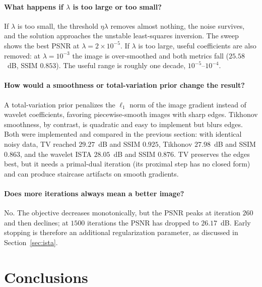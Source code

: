 \documentclass[11pt,a4paper]{article}
\begin{document}
\paragraph{What happens if $\lambda$ is too large or too small?}
If $\lambda$ is too small, the threshold $\eta\lambda$ removes almost nothing, the noise survives,
and the solution approaches the unstable least-squares inversion. The sweep shows the best PSNR at
$\lambda=2\times10^{-5}$. If $\lambda$ is too large, useful coefficients are also removed: at
$\lambda=10^{-3}$ the image is over-smoothed and both metrics fall ($25.58$~dB, SSIM $0.853$).
The useful range is roughly one decade, $10^{-5}$--$10^{-4}$.

\paragraph{How would a smoothness or total-variation prior change the result?}
A total-variation prior penalizes the $\ell_1$ norm of the image gradient instead of wavelet
coefficients, favoring piecewise-smooth images with sharp edges. Tikhonov smoothness, by contrast,
is quadratic and easy to implement but blurs edges. Both were implemented and compared in the
previous section: with identical noisy data, TV reached $29.27$~dB and SSIM $0.925$,
Tikhonov $27.98$~dB and SSIM $0.863$, and the wavelet ISTA $28.05$~dB and SSIM $0.876$. TV
preserves the edges best, but it needs a primal-dual iteration (its proximal step has no closed
form) and can produce staircase artifacts on smooth gradients.

\paragraph{Does more iterations always mean a better image?}
No. The objective decreases monotonically, but the PSNR peaks at iteration $260$ and then declines;
at $1500$ iterations the PSNR has dropped to $26.17$~dB. Early stopping is therefore an additional
regularization parameter, as discussed in Section~\ref{sec:ista}.

\section{Conclusions}
\end{document}
